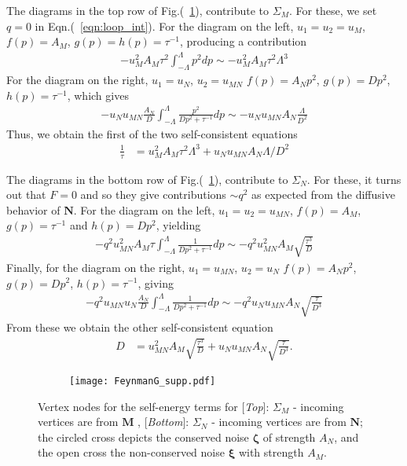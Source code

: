 \documentclass[prl,aps,twocolumn,nosuperscriptaddress,bibnotes,notitlepage,nofootinbib]{revtex4-2}
\newcommand{\magg}{\mathbf{M}}
\newcommand{\stagg}{\mathbf{N}}
\begin{document}
The diagrams in the top row of Fig.(~\ref{fig:oneloop_supp}), contribute to $\Sigma_M$. For these, we set $q=0$ in Eqn.(~\ref{eqn:loop_int}). For the diagram on the left, $u_1=u_2=u_M$, $f(p)=A_M$, $g(p)=h(p)=\tau^{-1}$, producing
a contribution
\begin{align*}
   -u_M^2 A_M \tau^2 \int_{-\Lambda}^\Lambda p^2 dp \sim -u_M^2 A_M \tau^2 \Lambda^3
\end{align*}
For the diagram on the right, $u_1=u_N$, $u_2=u_{MN}$ $f(p)=A_Np^2$, $g(p)=Dp^2$,$h(p)=\tau^{-1}$, which gives
\begin{align*}
   -u_N u_{MN} \frac{A_N}{D} \int_{-\Lambda}^\Lambda \frac{p^2} {Dp^2 + \tau^{-1}}dp \sim -u_N u_{MN} A_N \frac{\Lambda}{D^2}
\end{align*}
Thus, we obtain the first of the two self-consistent equations 
\begin{align*}
\frac{1}{\tau} &= u_M^2A_M\tau^2\Lambda^3 + u_N u_{MN}A_N\Lambda/D^2
\end{align*}

The diagrams in the bottom row of Fig.(~\ref{fig:oneloop_supp}), contribute to $\Sigma_N$. For these, it turns out that $F=0$ and so they give contributions $\sim q^2$ as expected from the diffusive behavior of $\stagg$. For the diagram on the left, $u_1=u_2=u_{MN}$, $f(p)=A_M$, $g(p)=\tau^{-1}$ and $h(p)=Dp^2$, yielding
\begin{align*}
   -q^2u_{MN}^2 A_M \tau \int_{-\Lambda}^\Lambda \frac{1}{Dp^2+\tau^{-1}} dp \sim -q^2u_{MN}^2A_M\sqrt{\frac{\tau^3}{D}}
\end{align*}
Finally, for the diagram on the right, $u_1=u_{MN}$, $u_2=u_N$ $f(p)=A_Np^2$,  $g(p)=Dp^2$, $h(p)=\tau^{-1}$, giving
\begin{align*}
-q^2u_{MN}u_N \frac{A_N}{D} \int_{-\Lambda}^\Lambda \frac{1} {Dp^2 + \tau^{-1}} dp \sim -q^2u_Nu_{MN}A_N \sqrt{\frac{\tau}{D^3}}
\end{align*}
From these we obtain the other self-consistent equation
\begin{align*}
D & = u_{MN}^2A_M\sqrt{\frac{\tau^3}{D}} + u_Nu_{MN}A_N \sqrt{\frac{\tau}{D^3}}.
\end{align*}

\begin{figure}[H]
\centering
\begin{subfigure}%
  \centering
  \texttt{[image: FeynmanG\_supp.pdf]}
\end{subfigure}
\caption{\small Vertex nodes for the self-energy terms for [\textit{Top}]: $\Sigma_M$ - incoming vertices are from $\magg$ , [\textit{Bottom}]: $\Sigma_N$ - incoming vertices are from $\stagg$; the circled cross depicts the conserved noise $\boldsymbol{\zeta}$ of strength $A_N$, and the open cross the non-conserved noise $\boldsymbol{\xi}$ with strength $A_M$.  }
\label{fig:oneloop_supp}
\end{figure}
\end{document}
